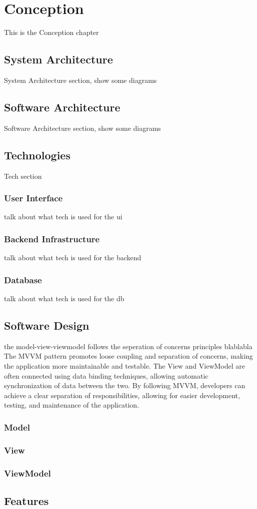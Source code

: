 \chapter{Conception}

This is the Conception chapter 

\section{System Architecture}
System Architecture section, show some diagrams

\section{Software Architecture}
Software Architecture section, show some diagrams

\section{Technologies}
Tech section
\subsection{User Interface}
talk about what tech is used for the ui
\subsection{Backend Infrastructure}
talk about what tech is used for the backend
\subsection{Database}
talk about what tech is used for the db


\section{Software Design}
the model-view-viewmodel follows the seperation of concerns principles blablabla
The MVVM pattern promotes loose coupling and separation of concerns, making the application more maintainable and testable. The View and ViewModel are often connected using data binding techniques, allowing automatic synchronization of data between the two.
By following MVVM, developers can achieve a clear separation of responsibilities, allowing for easier development, testing, and maintenance of the application.
\subsection{Model}
\subsection{View}
\subsection{ViewModel}

\section{Features}
